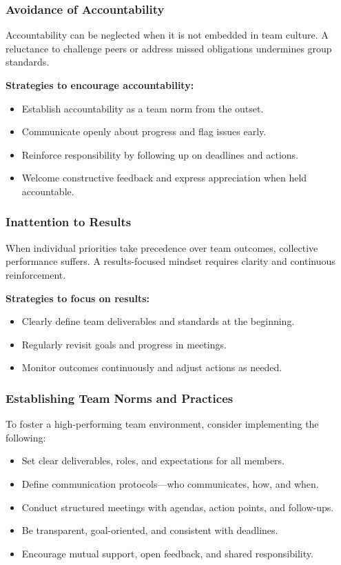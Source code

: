 \documentclass{article}
\begin{document}
\subsubsection{Avoidance of Accountability}

Accountability can be neglected when it is not embedded in team culture. A reluctance to challenge peers or address missed obligations undermines group standards.

\vspace{1em}
\textbf{Strategies to encourage accountability:}
\begin{itemize}
    \item Establish accountability as a team norm from the outset.
    \item Communicate openly about progress and flag issues early.
    \item Reinforce responsibility by following up on deadlines and actions.
    \item Welcome constructive feedback and express appreciation when held accountable.
\end{itemize}

\subsubsection{Inattention to Results}

When individual priorities take precedence over team outcomes, collective performance suffers. A results-focused mindset requires clarity and continuous reinforcement.

\vspace{1em}
\textbf{Strategies to focus on results:}
\begin{itemize}
    \item Clearly define team deliverables and standards at the beginning.
    \item Regularly revisit goals and progress in meetings.
    \item Monitor outcomes continuously and adjust actions as needed.
\end{itemize}

\subsubsection{Establishing Team Norms and Practices}

To foster a high-performing team environment, consider implementing the following:

\begin{itemize}
    \item Set clear deliverables, roles, and expectations for all members.
    \item Define communication protocols—who communicates, how, and when.
    \item Conduct structured meetings with agendas, action points, and follow-ups.
    \item Be transparent, goal-oriented, and consistent with deadlines.
    \item Encourage mutual support, open feedback, and shared responsibility.
\end{itemize}
\end{document}
